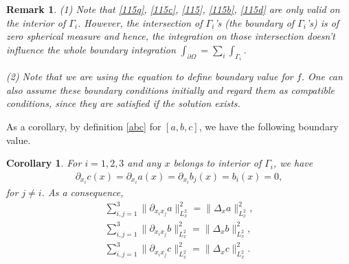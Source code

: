\documentclass[reqno,a4paper]{amsart}
\newtheorem{Coro}[Thm]{Corollary}
\newtheorem{Rem}[Thm]{Remark}
\numberwithin{equation}{section}
\newcommand{\1}{\mathbf{1}}
\newcommand{\<}{\langle}
\renewcommand{\>}{\rangle}
\begin{document}
\begin{Rem}
	
	(1)	Note that \eqref{115q}, \eqref{115c}, \eqref{115}, \eqref{115b}, \eqref{115d} are only valid on the interior of $\Gamma_i$. However, the intersection of $\Gamma_i$'s (the boundary of $\Gamma_i$'s) is of zero spherical measure and hence, the integration on those intersection doesn't influence the whole boundary integration $\int_{\partial\Omega}= \sum_i\int_{\Gamma_i}$. 
	
	(2) Note that we are using the equation to define boundary value for $f$. One can also assume these boundary conditions initially and regard them as compatible conditions, since they are satisfied if the solution exists. 
\end{Rem}
As a corollary, by definition \eqref{abc} for $[a,b,c]$, we have the following boundary value.
\begin{Coro}\label{Lem25}
	For $i=1,2,3$ and any $x$ belongs to interior of $\Gamma_i$, we have 
	\begin{align}\label{Lem25a}
		\partial_{x_i}c(x) =\partial_{x_i}a(x)=\partial_{x_i}b_j(x)=	b_i(x) = 0,
	\end{align}for $j\neq i$. 
	As a consequence, 
	\begin{equation}\label{2.14}
		\begin{aligned}
			\sum_{i,j=1}^3\|\partial_{x_ix_j}a\|^2_{L^2_x} = \|\Delta_xa\|^2_{L^2_x},\\ \sum_{i,j=1}^3\|\partial_{x_ix_j}b\|^2_{L^2_x} = \|\Delta_xb\|^2_{L^2_x},\\ \sum_{i,j=1}^3\|\partial_{x_ix_j}c\|^2_{L^2_x} = \|\Delta_xc\|^2_{L^2_x}. 
		\end{aligned}
	\end{equation}
\end{Coro}
\end{document}
